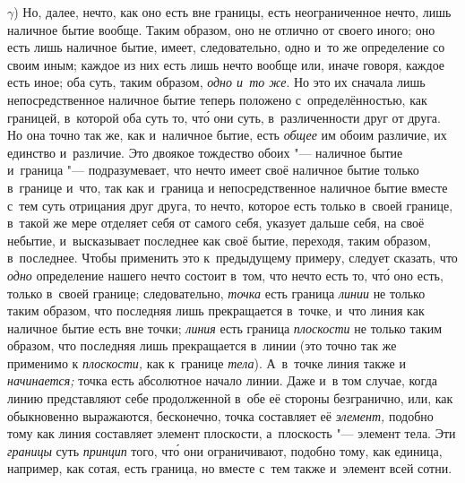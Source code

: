 $\gamma$) Но, далее, нечто, как оно есть вне границы, есть
неограниченное нечто, лишь наличное бытие вообще. Таким образом, оно не
отлично от своего иного; оно есть лишь наличное бытие, имеет,
следовательно, одно и~то же определение со своим иным; каждое из них есть
лишь нечто вообще или, иначе говоря, каждое есть иное; оба суть, таким
образом, {\em одно и~то же}. Но это их сначала лишь
непосредственное наличное бытие теперь положено с~определённостью, как
границей, в~которой оба суть то, чт\'{о} они суть, в~различенности друг от
друга. Но она точно так же, как и~наличное бытие, есть
{\em общее} им обоим различие, их единство и~различие.
Это двоякое тождество обоих "--- наличное бытие и~граница "--- подразумевает, что
нечто имеет своё наличное бытие только в~границе и~что, так как и~граница и
непосредственное наличное бытие вместе с~тем суть отрицания друг друга, то
нечто, которое есть только в~своей границе, в~такой же мере отделяет себя
от самого себя, указует дальше себя, на своё небытие, и~высказывает
последнее как своё бытие, переходя, таким образом, в~последнее. Чтобы
применить это к~предыдущему примеру, следует сказать, что
{\em одно} определение нашего нечто состоит в~том, что
нечто есть то, чт\'{о} оно есть, только в~своей границе; следовательно,
{\em точка} есть граница
{\em линии} не только таким образом, что последняя лишь
прекращается в~точке, и~что линия как наличное бытие есть вне точки;
{\em линия} есть граница
{\em плоскости} не только таким образом, что последняя
лишь прекращается в~линии (это точно так же применимо к
{\em плоскости,} как к~границе
{\em тела}). А~в~точке линия также и
{\em начинается;} точка есть абсолютное начало линии.
Даже и~в том случае, когда линию представляют себе продолженной в~обе её
стороны безгранично, или, как обыкновенно выражаются, бесконечно, точка
составляет её {\em элемент,} подобно тому как линия
составляет элемент плоскости, а~плоскость "--- элемент тела. Эти
{\em границы} суть {\em принцип}
того, чт\'{о} они ограничивают, подобно тому, как единица, например, как сотая,
есть граница, но вместе с~тем также и~элемент всей сотни.

